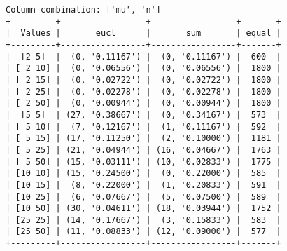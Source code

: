 \documentclass{article}
\begin{document}
\begin{verbatim}
Column combination: ['mu', 'n']
+---------+-----------------+-----------------+-------+
|  Values |       eucl      |       sum       | equal |
+---------+-----------------+-----------------+-------+
|  [2 5]  |  (0, '0.11167') |  (0, '0.11167') |  600  |
| [ 2 10] |  (0, '0.06556') |  (0, '0.06556') |  1800 |
| [ 2 15] |  (0, '0.02722') |  (0, '0.02722') |  1800 |
| [ 2 25] |  (0, '0.02278') |  (0, '0.02278') |  1800 |
| [ 2 50] |  (0, '0.00944') |  (0, '0.00944') |  1800 |
|  [5 5]  | (27, '0.38667') |  (0, '0.34167') |  573  |
| [ 5 10] |  (7, '0.12167') |  (1, '0.11167') |  592  |
| [ 5 15] | (17, '0.11250') |  (2, '0.10000') |  1181 |
| [ 5 25] | (21, '0.04944') | (16, '0.04667') |  1763 |
| [ 5 50] | (15, '0.03111') | (10, '0.02833') |  1775 |
| [10 10] | (15, '0.24500') |  (0, '0.22000') |  585  |
| [10 15] |  (8, '0.22000') |  (1, '0.20833') |  591  |
| [10 25] |  (6, '0.07667') |  (5, '0.07500') |  589  |
| [10 50] | (30, '0.04611') | (18, '0.03944') |  1752 |
| [25 25] | (14, '0.17667') |  (3, '0.15833') |  583  |
| [25 50] | (11, '0.08833') | (12, '0.09000') |  577  |
+---------+-----------------+-----------------+-------+
\end{verbatim}
\end{document}
